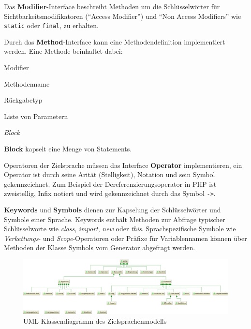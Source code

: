 Das \textbf{Modifier}-Interface beschreibt Methoden um die Schlüsselwörter für Sichtbarkeitsmodifikatoren (\enquote{Access Modifier}) und \enquote{Non Access Modifiers} wie \texttt{static} oder \texttt{final}, zu erhalten.

Durch das \textbf{Method}-Interface kann eine Methodendefinition implementiert werden. Eine Methode beinhaltet dabei:
\begin{compactitem}
    \item Modifier
    \item Methodenname
    \item Rückgabetyp
    \item Liste von Parametern %
    \item \emph{Block}
\end{compactitem}

\textbf{Block} kapselt eine Menge von Statements.

Operatoren der Zielsprache müssen das Interface \textbf{Operator} implementieren, ein Operator ist durch seine Arität (Stelligkeit), Notation und sein Symbol gekennzeichnet. Zum Beispiel der Dereferenzierungsoperator in PHP ist zweistellig, Infix notiert und wird gekennzeichnet durch das Symbol \texttt{->}.

\textbf{Keywords} und \textbf{Symbols} dienen zur Kapselung der Schlüsselwörter und Symbole einer Sprache. Keywords enthält Methoden zur Abfrage typischer Schlüsselworte wie \emph{class}, \emph{import}, \emph{new} oder \emph{this}. Sprachspezifische Symbole wie \emph{Verkettungs}- und \emph{Scope}-Operatoren oder Präfixe für Variablennamen können über Methoden der Klasse Symbols vom Generator abgefragt werden.

\begin{figure}
    \centering
    \includegraphics[width=\textheight]{resources/languagemodel_common}
    \caption{UML Klassendiagramm des Zielsprachenmodells}
    \label{fig:language_model}
\end{figure}
